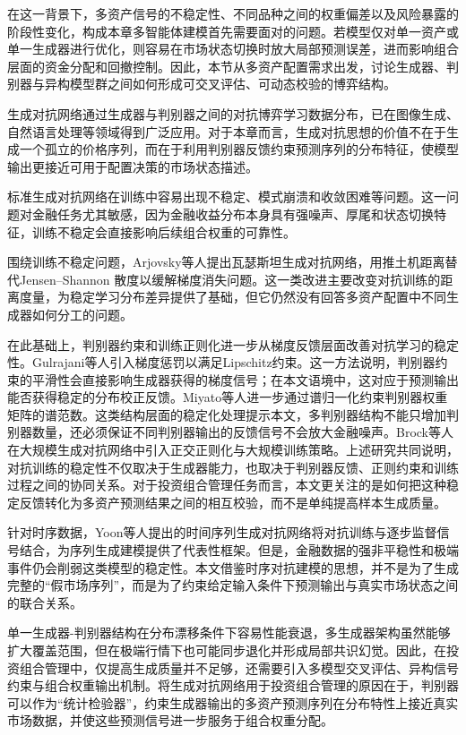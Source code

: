 在这一背景下，多资产信号的不稳定性、不同品种之间的权重偏差以及风险暴露的阶段性变化，构成本章多智能体建模首先需要面对的问题。若模型仅对单一资产或单一生成器进行优化，则容易在市场状态切换时放大局部预测误差，进而影响组合层面的资金分配和回撤控制。因此，本节从多资产配置需求出发，讨论生成器、判别器与异构模型群之间如何形成可交叉评估、可动态校验的博弈结构。

生成对抗网络通过生成器与判别器之间的对抗博弈学习数据分布，已在图像生成、自然语言处理等领域得到广泛应用\cite{goodfellow2014generative}。对于本章而言，生成对抗思想的价值不在于生成一个孤立的价格序列，而在于利用判别器反馈约束预测序列的分布特征，使模型输出更接近可用于配置决策的市场状态描述。

标准生成对抗网络在训练中容易出现不稳定、模式崩溃和收敛困难等问题\cite{gui2023review}。这一问题对金融任务尤其敏感，因为金融收益分布本身具有强噪声、厚尾和状态切换特征，训练不稳定会直接影响后续组合权重的可靠性。

围绕训练不稳定问题，Arjovsky等人提出瓦瑟斯坦生成对抗网络，用推土机距离替代Jensen--Shannon 散度以缓解梯度消失问题\cite{arjovsky2017wasserstein}。这一类改进主要改变对抗训练的距离度量，为稳定学习分布差异提供了基础，但它仍然没有回答多资产配置中不同生成器如何分工的问题。

在此基础上，判别器约束和训练正则化进一步从梯度反馈层面改善对抗学习的稳定性。Gulrajani等人引入梯度惩罚以满足Lipschitz约束\cite{gulrajani2017improved}。这一方法说明，判别器约束的平滑性会直接影响生成器获得的梯度信号；在本文语境中，这对应于预测输出能否获得稳定的分布校正反馈。Miyato等人进一步通过谱归一化约束判别器权重矩阵的谱范数\cite{miyato2018spectral}。这类结构层面的稳定化处理提示本文，多判别器结构不能只增加判别器数量，还必须保证不同判别器输出的反馈信号不会放大金融噪声。Brock等人在大规模生成对抗网络中引入正交正则化与大规模训练策略\cite{Brock:2018rok}。上述研究共同说明，对抗训练的稳定性不仅取决于生成器能力，也取决于判别器反馈、正则约束和训练过程之间的协同关系。对于投资组合管理任务而言，本文更关注的是如何把这种稳定反馈转化为多资产预测结果之间的相互校验，而不是单纯提高样本生成质量。

针对时序数据，Yoon等人提出的时间序列生成对抗网络将对抗训练与逐步监督信号结合，为序列生成建模提供了代表性框架\cite{10.5555/3454287.3454781}。但是，金融数据的强非平稳性和极端事件仍会削弱这类模型的稳定性。本文借鉴时序对抗建模的思想，并不是为了生成完整的“假市场序列”，而是为了约束给定输入条件下预测输出与真实市场状态之间的联合关系。

单一生成器-判别器结构在分布漂移条件下容易性能衰退，多生成器架构虽然能够扩大覆盖范围，但在极端行情下也可能同步退化并形成局部共识幻觉\cite{ghosh2017multi}。因此，在投资组合管理中，仅提高生成质量并不足够，还需要引入多模型交叉评估、异构信号约束与组合权重输出机制。将生成对抗网络用于投资组合管理的原因在于，判别器可以作为“统计检验器”，约束生成器输出的多资产预测序列在分布特性上接近真实市场数据，并使这些预测信号进一步服务于组合权重分配。

